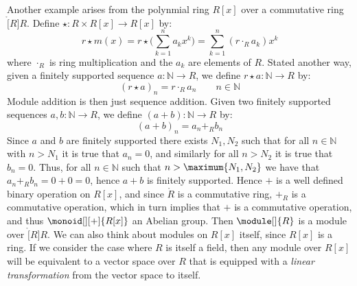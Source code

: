     \begin{example}
        Another example arises from the polynmial ring $R[x]$ over a commutative
        ring $\ring[R]{R}$. Define $\star:R\times{R}[x]\rightarrow{R}[x]$ by:
        \begin{equation}
            r\star{m}(x)=r\star\Big(\sum_{k=1}^{n}a_{k}x^{k}\Big)
                        =\sum_{k=1}^{n}(r\cdot_{R}{a}_{k})x^{k}
        \end{equation}
        where $\cdot_{R}$ is ring multiplication and the $a_{k}$ are elements of
        $R$. Stated another way, given a finitely supported sequence
        $a:\mathbb{N}\rightarrow{R}$, we define
        $r\star{a}:\mathbb{N}\rightarrow{R}$ by:
        \begin{equation}
            (r\star{a})_{n}=r\cdot_{R}a_{n}
            \quad\quad
            n\in\mathbb{N}
        \end{equation}
        Module addition is then just sequence addition. Given two finitely
        supported sequences $a,b:\mathbb{N}\rightarrow{R}$, we define
        $(a+b):\mathbb{N}\rightarrow{R}$ by:
        \begin{equation}
            (a+b)_{n}=a_{n}+_{R}b_{n}
        \end{equation}
        Since $a$ and $b$ are finitely supported there exists $N_{1},N_{2}$
        such that for all $n\in\mathbb{N}$ with $n>N_{1}$ it is true that
        $a_{n}=0$, and similarly for all $n>N_{2}$ it is true that $b_{n}=0$.
        Thus, for all $n\in\mathbb{N}$ such that $n>\maximum{N_{1},N_{2}}$
        we have that $a_{n}+_{R}b_{n}=0+0=0$, hence $a+b$ is finitely supported.
        Hence $+$ is a well defined binary operation on $R[x]$, and since
        $\ring{R}$ is a commutative ring, $+_{R}$ is a commutative operation,
        which in turn implies that $+$ is a commutative operation, and thus
        $\monoid[][+]{R[x]}$ an Abelian group. Then $\module[]{R}$ is a module
        over $\ring[R]{R}$. We can also think about modules on $R[x]$ itself,
        since $R[x]$ is a ring. If we consider the case where $R$ is itself a
        field, then any module over $R[x]$ will be equivalent to a vector space
        over $R$ that is equipped with a \textit{linear transformation} from
        the vector space to itself.
    \end{example}
